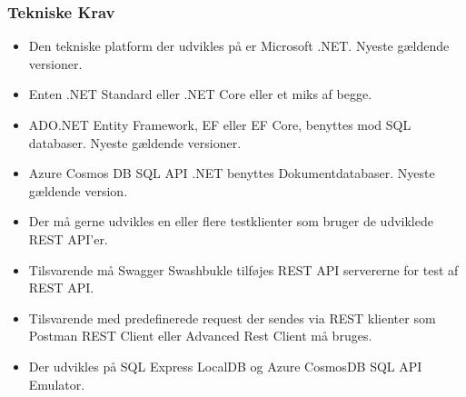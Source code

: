 \subsubsection{Tekniske Krav}

\begin{itemize}
    \item Den tekniske  platform der udvikles på er Microsoft .NET. Nyeste gældende versioner.
    \item Enten .NET Standard eller .NET Core eller et miks af begge. 
    \item ADO.NET Entity Framework, EF eller EF Core, benyttes mod SQL databaser. Nyeste gældende versioner.
    \item Azure Cosmos DB SQL API .NET benyttes Dokumentdatabaser. Nyeste gældende version.
    \item Der må gerne udvikles en eller flere testklienter som bruger de udviklede REST API'er.
    \item Tilsvarende må Swagger Swashbukle tilføjes REST API servererne for test af REST API.
    \item Tilsvarende med predefinerede request der sendes via REST klienter som Postman REST Client eller Advanced Rest Client må bruges.
    \item Der udvikles på SQL Express LocalDB og Azure CosmosDB SQL API Emulator.
\end{itemize}
